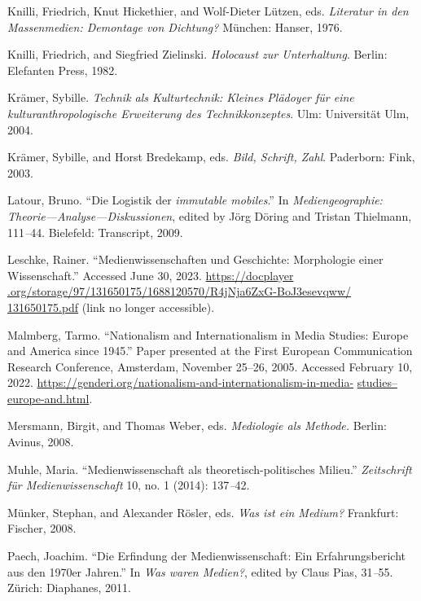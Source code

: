 \documentclass{tufte-handout}
\begin{document}
\begin{hangparas}{.25in}{1}
Knilli, Friedrich, Knut Hickethier, and Wolf-Dieter Lützen, eds.
\emph{Literatur in den Massenmedien: Demontage von Dichtung?} München:
Hanser, 1976.

Knilli, Friedrich, and Siegfried Zielinski. \emph{Holocaust zur
Unterhaltung}. Berlin: Elefanten Press, 1982.

Krämer, Sybille. \emph{Technik als Kulturtechnik: Kleines Plädoyer für
eine kulturanthropologische Erweiterung des Technikkonzeptes}. Ulm:
Universität Ulm, 2004.

Krämer, Sybille, and Horst Bredekamp, eds. \emph{Bild, Schrift, Zahl}.
Paderborn: Fink, 2003.

Latour, Bruno. ``Die Logistik der \emph{immutable mobiles}.'' In
\emph{Mediengeographie: Theorie---Analyse---Diskussionen}, edited by
Jörg Döring and Tristan Thielmann, 111\emph{--}44. Bielefeld:
Transcript, 2009.

Leschke, Rainer. ``Medienwissenschaften und Geschichte: Morphologie
einer Wissenschaft.'' Accessed June 30, 2023. \href{https://docplayer.org/storage/97/131650175/1688120570/R4jNja6ZxG-BoJ3esevqww/131650175.pdf}{https://docplayer} \href{https://docplayer.org/storage/97/131650175/1688120570/R4jNja6ZxG-BoJ3esevqww/131650175.pdf}{.org/storage/97/131650175/1688120570/R4jNja6ZxG-BoJ3esevqww/} \href{https://docplayer.org/storage/97/131650175/1688120570/R4jNja6ZxG-BoJ3esevqww/131650175.pdf}{131650175.pdf}
(link no longer accessible).

Malmberg, Tarmo. ``Nationalism and Internationalism in Media Studies:
Europe and America since 1945.'' Paper presented at the First European
Communication Research Conference, Amsterdam, November 25--26, 2005.
Accessed February 10, 2022.
\href{https://genderi.org/nationalism-and-internationalism-in-media-studies--europe-and.html}{https://genderi.org/nationalism-and-internationalism-in-media-} \href{https://genderi.org/nationalism-and-internationalism-in-media-studies--europe-and.html}{studies--europe-and.html}.

Mersmann\emph{,} Birgit, and Thomas Weber, eds. \emph{Mediologie als
Methode.} Berlin: Avinus, 2008.

Muhle, Maria. ``Medienwissenschaft als theoretisch-politisches Milieu.''
\emph{Zeitschrift für Medienwissenschaft} 10, no. 1 (2014):
137\emph{--}42.

Münker, Stephan, and Alexander Rösler, eds. \emph{Was ist ein Medium?}
Frankfurt: Fischer, 2008.

Paech, Joachim. ``Die Erfindung der Medienwissenschaft: Ein
Erfahrungsbericht aus den 1970er Jahren.'' In \emph{Was waren Medien?},
edited by Claus Pias, 31\emph{--}55. Zürich: Diaphanes, 2011.


\end{hangparas}
\end{document}
